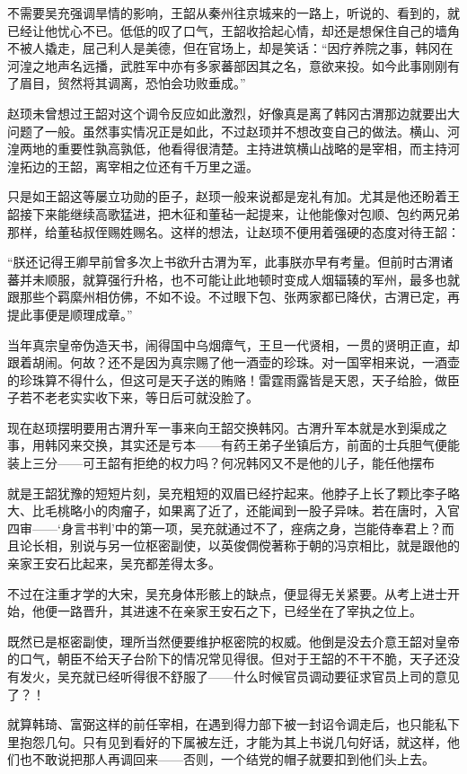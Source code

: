 不需要吴充强调旱情的影响，王韶从秦州往京城来的一路上，听说的、看到的，就已经让他忧心不已。低低的叹了口气，王韶收拾起心情，却还是想保住自己的墙角不被人撬走，屈己利人是美德，但在官场上，却是笑话：“因疗养院之事，韩冈在河湟之地声名远播，武胜军中亦有多家蕃部因其之名，意欲来投。如今此事刚刚有了眉目，贸然将其调离，恐怕会功败垂成。”

赵顼未曾想过王韶对这个调令反应如此激烈，好像真是离了韩冈古渭那边就要出大问题了一般。虽然事实情况正是如此，不过赵顼并不想改变自己的做法。横山、河湟两地的重要性孰高孰低，他看得很清楚。主持进筑横山战略的是宰相，而主持河湟拓边的王韶，离宰相之位还有千万里之遥。

只是如王韶这等屡立功勋的臣子，赵顼一般来说都是宠礼有加。尤其是他还盼着王韶接下来能继续高歌猛进，把木征和董毡一起提来，让他能像对包顺、包约两兄弟那样，给董毡叔侄赐姓赐名。这样的想法，让赵顼不便用着强硬的态度对待王韶：

“朕还记得王卿早前曾多次上书欲升古渭为军，此事朕亦早有考量。但前时古渭诸蕃并未顺服，就算强行升格，也不可能让此地顿时变成人烟辐辏的军州，最多也就跟那些个羁縻州相仿佛，不如不设。不过眼下包、张两家都已降伏，古渭已定，再提此事便是顺理成章。”

当年真宗皇帝伪造天书，闹得国中乌烟瘴气，王旦一代贤相，一贯的贤明正直，却跟着胡闹。何故？还不是因为真宗赐了他一酒壶的珍珠。对一国宰相来说，一酒壶的珍珠算不得什么，但这可是天子送的贿赂！雷霆雨露皆是天恩，天子给脸，做臣子若不老老实实收下来，等日后可就没脸了。

现在赵顼摆明要用古渭升军一事来向王韶交换韩冈。古渭升军本就是水到渠成之事，用韩冈来交换，其实还是亏本——有药王弟子坐镇后方，前面的士兵胆气便能装上三分——可王韶有拒绝的权力吗？何况韩冈又不是他的儿子，能任他摆布

就是王韶犹豫的短短片刻，吴充粗短的双眉已经拧起来。他脖子上长了颗比李子略大、比毛桃略小的肉瘤子，如果离了近了，还能闻到一股子异味。若在唐时，入官四审——‘身言书判’中的第一项，吴充就通过不了，痤病之身，岂能侍奉君上？而且论长相，别说与另一位枢密副使，以英俊倜傥著称于朝的冯京相比，就是跟他的亲家王安石比起来，吴充都差得太多。

不过在注重才学的大宋，吴充身体形骸上的缺点，便显得无关紧要。从考上进士开始，他便一路晋升，其进速不在亲家王安石之下，已经坐在了宰执之位上。

既然已是枢密副使，理所当然便要维护枢密院的权威。他倒是没去介意王韶对皇帝的口气，朝臣不给天子台阶下的情况常见得很。但对于王韶的不干不脆，天子还没有发火，吴充就已经听得很不舒服了——什么时候官员调动要征求官员上司的意见了？！

就算韩琦、富弼这样的前任宰相，在遇到得力部下被一封诏令调走后，也只能私下里抱怨几句。只有见到看好的下属被左迁，才能为其上书说几句好话，就这样，他们也不敢说把那人再调回来——否则，一个结党的帽子就要扣到他们头上去。

